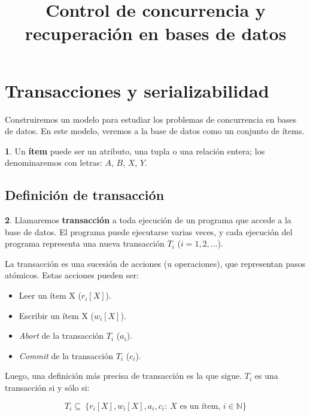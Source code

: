 \documentclass[english,titlepage]{article}
\theoremstyle{definition}
\theoremstyle{definition}
\newtheorem*{defn*}{\protect\definitionname}
\providecommand{\definitionname}{Definición}
\begin{document}
\title{Control de concurrencia y \\recuperación en bases de datos}
\maketitle

\tableofcontents

\newpage

\section{Transacciones y serializabilidad}

Construiremos un modelo para estudiar los problemas de concurrencia en bases
de datos. En este modelo, veremos a la base de datos como un conjunto de
ítems.

\begin{defn*}
Un \textbf{ítem} puede ser un atributo, una tupla o una relación entera; los
denominaremos con letras: $A$, $B$, $X$, $Y$.
\end{defn*}

\subsection{Definición de transacción}

\begin{defn*}
Llamaremos \textbf{transacción} a toda ejecución de un programa que accede a
la base de datos. El programa puede ejecutarse varias veces, y cada ejecución
del programa representa una nueva transacción $T_i$ ($i = 1, 2, \dots$).

La transacción es una sucesión de acciones (u operaciones), que representan
pasos atómicos. Estas acciones pueden ser:

\begin{itemize}
    \item Leer un ítem X ($r_i[X]$).
    \item Escribir un ítem X ($w_i[X]$).
    \item \emph{Abort} de la transacción $T_i$ ($a_i$).
    \item \emph{Commit} de la transacción $T_i$ ($c_i$).
\end{itemize}

Luego, una definición más precisa de transacción es la que sigue. $T_i$ es una
transacción si y sólo si:

$$T_i \subseteq \
    \{r_i[X], w_i[X], a_i, c_i: \
        X \mbox{ es un ítem, } i \in \mathbb{N}\}$$
\end{defn*}
\end{document}
